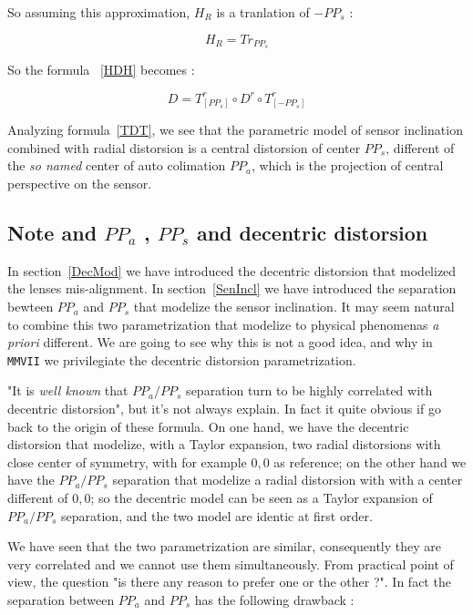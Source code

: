 So assuming this approximation,  $H_{R}$ is a tranlation of $ - PP_s$ :

\begin{equation}
	H_{R} = Tr_{PP_s}
\end{equation}

So the formula ~\ref{HDH} becomes :

\begin{equation}
	D =    T^r_{[PP_s]}  \circ  D^r \circ  T^r_{[-PP_s]} \label{TDT}
\end{equation}

Analyzing formula~\ref{TDT}, we see
that the parametric model of sensor inclination  combined with radial distorsion
is a central distorsion of center $PP_s$, different of the \emph{so named}
center of auto colimation $PP_a$, which is the projection of central perspective on the sensor.


\subsection{Note and $PP_a$ , $PP_s$ and decentric distorsion}
\label{PPA:PPS:DEC}

In section~\ref{DecMod} we have introduced the decentric distorsion that
modelized the lenses mis-alignment.  In  section~\ref{SenIncl}
we have introduced the separation bewteen $PP_a$ and $PP_s$ that modelize
the sensor inclination.  It may seem natural to combine this two
parametrization that modelize to physical phenomenas \emph{a priori}
different. We are going to see why this is not a good idea, and why in
{\tt MMVII} we privilegiate the decentric distorsion parametrization.

"It is \emph{well known} that  $PP_a/PP_s$ separation turn to be highly
correlated with decentric distorsion", but it's not always explain. In fact
it quite obvious if go back to the origin of these formula.  On one hand, we have 
the decentric distorsion that modelize, with a Taylor expansion, two radial distorsions
with close center of symmetry, with for example $0,0$ as reference;
on the other hand we have the $PP_a/PP_s$ separation that modelize 
a radial distorsion with with a center different of $0,0$; so the decentric model
can be seen as a Taylor expansion of $PP_a/PP_s$  separation, and the two model
are identic at first order.


We have seen that the two parametrization are similar, consequently they are
very correlated and we cannot use them simultaneously. From practical point of view,
the question "is there any reason to prefer one or the other ?".
In fact the separation between $PP_a$ and $PP_s$ has the following drawback :

